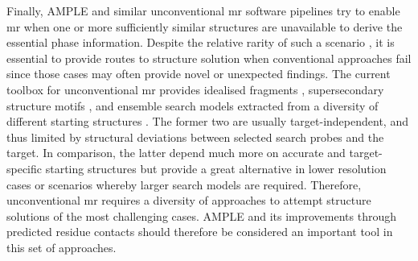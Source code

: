 Finally, AMPLE and similar unconventional \gls{mr} software pipelines try to enable \gls{mr} when one or more sufficiently similar structures are unavailable to derive the essential phase information. Despite the relative rarity of such a scenario \cite{Chandonia2017-vf}, it is essential to provide routes to structure solution when conventional approaches fail since those cases may often provide novel or unexpected findings. The current toolbox for unconventional \gls{mr} provides idealised fragments \cite{Sammito2015-dv,Thomas2015-wu,Jenkins2018-gf}, supersecondary structure motifs \cite{Sammito2013-ug}, and ensemble search models extracted from a diversity of different starting structures \cite{Rigden2018-zt,Bibby2012-lm,Bibby2013-cp}. The former two are usually target-independent, and thus limited by structural deviations between selected search probes and the target. In comparison, the latter depend much more on accurate and target-specific starting structures but provide a great alternative in lower resolution cases or scenarios whereby larger search models are required. Therefore, unconventional \gls{mr} requires a diversity of approaches to attempt structure solutions of the most challenging cases. AMPLE and its improvements through predicted residue contacts should therefore be considered an important tool in this set of approaches.
